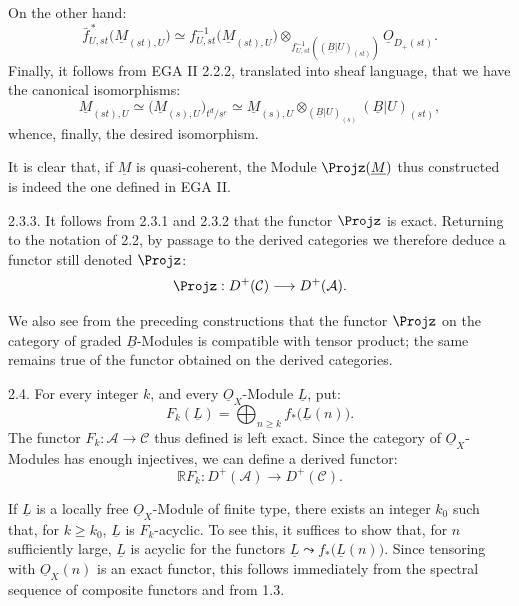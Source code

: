 On the other hand:
\[
  \bar f_{U,st}^{\,*}\bigl(\underline{M}_{(st),U}\bigr)
  \simeq
  f_{U,st}^{-1}\bigl(\underline{M}_{(st),U}\bigr)
  \otimes_{f_{U,st}^{-1}((\underline{B}|U)_{(st)})}\underline{O}_{D_+(st)} .
\]
Finally, it follows from EGA II 2.2.2, translated into sheaf language, that we have the canonical isomorphisms:
\[
  \underline{M}_{(st),U}\simeq
  \bigl(\underline{M}_{(s),U}\bigr)_{t^d/s^e}
  \simeq
  \underline{M}_{(s),U}\otimes_{(\underline{B}|U)_{(s)}}(\underline{B}|U)_{(st)},
\]
whence, finally, the desired isomorphism.

It is clear that, if \(\underline{M}\) is quasi-coherent, the Module \(\Projz(\underline{M})\) thus constructed is indeed the one defined in EGA II.

2.3.3. It follows from 2.3.1 and 2.3.2 that the functor \(\Projz\) is exact. Returning to the notation of 2.2, by passage to the derived categories we therefore deduce a functor still denoted \(\Projz\):
\[
  \Projz:D^+(\mathcal C)\longrightarrow D^+(\mathcal A).
\]

We also see from the preceding constructions that the functor
%
\(\Projz\) on the category of graded \(\underline{B}\)-Modules is compatible with tensor product; the same remains true of the functor obtained on the derived categories.

2.4. For every integer $k$, and every $\underline{O}_X$-Module $\underline{L}$, put:
\begin{equation}\tag{2.4.1}
  F_k(\underline{L})=\bigoplus_{n\geq k} f_*\bigl(\underline{L}(n)\bigr).
\end{equation}
The functor $F_k:\mathcal A\to\mathcal C$ thus defined is left exact. Since the category of $\underline{O}_X$-Modules has enough injectives, we can define a derived functor:
\begin{equation}\tag{2.4.2}
  \mathbb R F_k:D^+(\mathcal A)\longrightarrow D^+(\mathcal C).
\end{equation}

If $\underline{L}$ is a locally free $\underline{O}_X$-Module of finite type, there exists an integer $k_0$ such that, for $k\geq k_0$, $\underline{L}$ is $F_k$-acyclic. To see this, it suffices to show that, for $n$ sufficiently large, $\underline{L}$ is acyclic for the functors $\underline{L}\leadsto f_*\bigl(\underline{L}(n)\bigr)$. Since tensoring with $\underline{O}_X(n)$ is an exact functor, this follows immediately from the spectral sequence of composite functors and from 1.3.

